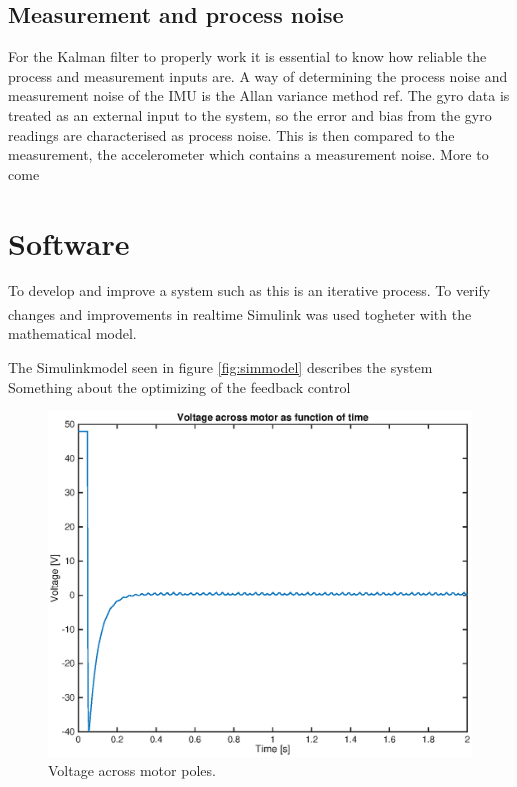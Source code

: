 \documentclass[a4paper,11pt]{kth-mag}
\begin{document}
\subsection{Measurement and process noise}
For the Kalman filter to properly work it is essential to know how reliable the process and measurement inputs are. A way of determining the process noise and measurement noise of the IMU is the Allan variance method ref.
The gyro data is treated as an external input to the system, so the error and bias from the gyro readings are characterised as process noise. This is then compared to the measurement, the accelerometer which contains a measurement noise.
More to come

\section{Software}
To develop and improve a system such as this is an iterative process. To verify changes and improvements in realtime Simulink\textsuperscript{\textregistered} was used togheter with the mathematical model. 



The Simulinkmodel seen in figure \ref{fig:simmodel} describes the system
\\ Something about the  optimizing of the feedback control
\begin{figure}[!htb]
\centering
\includegraphics[scale=.7]{voltageplot.eps}
\caption{Voltage across motor poles.}
\label{fig:voltageplot}
\end{figure}
\end{document}
